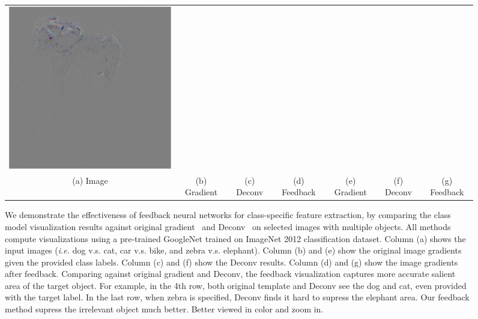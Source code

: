 \begin{figure}
\begin{center}
\begin{tabular}{ccccccc}
\includegraphics[width=0.14\linewidth,height=0.115\linewidth]{figs/examples/googlenet/soft/zeb-ele2_diff_387} \\
{\small (a) Image} &
{\small (b) Gradient} &
{\small (c) Deconv} &
{\small (d) Feedback} &
{\small (e) Gradient} &
{\small (f) Deconv} &
{\small (g) Feedback} \\
\end{tabular}
\caption{We demonstrate the effectiveness of feedback neural networks for class-specific feature extraction, by comparing the class model visualization results against original gradient~\cite{simonyan2013deep} and Deconv~\cite{zeiler2014visualizing} on selected images with multiple objects. All methods compute visualizations using a pre-trained GoogleNet trained on ImageNet 2012 classification dataset. Column (a) shows the input images (\emph{i.e.} dog v.s. cat, car v.s. bike, and zebra v.s. elephant). Column (b) and (e) show the original image gradients given the provided class labels. Column (c) and (f) show the Deconv results. Column (d) and (g) show the image gradients after feedback. Comparing against original gradient and Deconv, the feedback visualization captures more accurate salient area of the target object. For example, in the 4th row, both original template and Deconv see the dog and cat, even provided with the target label. In the last row, when zebra is specified, Deconv finds it hard to supress the elephant area. Our feedback method supress the irrelevant object much better. Better viewed in color and zoom in.} 
\label{fig:examples}
\end{center}
\end{figure}

